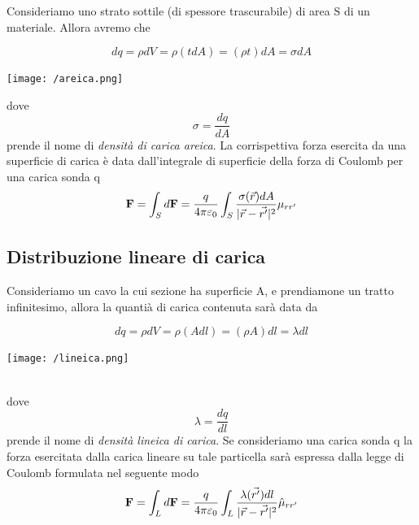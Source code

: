 Consideriamo uno strato sottile (di spessore trascurabile) di area S di un materiale. Allora avremo che 

\begin{minipage}{0.6\textwidth}
\begin{equation*}
dq = \rho dV = \rho (tdA) = (\rho t)dA = \sigma dA
\end{equation*}
\end{minipage}
\begin{minipage}{0.4\textwidth}
\centering
\texttt{[image: /areica.png]}
\end{minipage}
dove 
\begin{equation*}
	\sigma = \frac{dq}{dA}
\end{equation*}
prende il nome di \textit{densit\`a di carica areica}. La corrispettiva forza esercita da una superficie di carica \`e data dall'integrale di superficie della forza di Coulomb per una carica sonda q 
\begin{equation*}
	\bold{F} = \int_{S}d\bold{F} = \frac{q}{4 \pi \varepsilon_0} \int_{S} \frac{\sigma(\vec{r})dA}{|\vec{r}-\vec{r'}|^2} \mu_{rr'}
\end{equation*}

\subsection{Distribuzione lineare di carica}

Consideriamo un cavo  la cui sezione ha superficie A, e prendiamone un tratto infinitesimo, allora la quanti\`a di carica contenuta sar\`a data da

\begin{minipage}{0.6\textwidth}
\begin{equation*}
dq = \rho dV = \rho (Adl) = (\rho A)dl = \lambda dl
\end{equation*}
\end{minipage}
\begin{minipage}{0.3\textwidth}
\centering
\texttt{[image: /lineica.png]}
\end{minipage}
\\
dove 
\begin{equation*}
	\lambda = \frac{dq}{dl}
\end{equation*}
prende il nome di \textit{densit\`a lineica di carica}. Se consideriamo una carica sonda q la forza esercitata dalla carica lineare su tale particella sar\`a espressa dalla legge di Coulomb formulata nel seguente modo
\begin{equation*}
	\bold{F} = \int_{L} d\bold{F} = \frac{q}{4 \pi \varepsilon_0} \int_{L} \frac{\lambda(\vec{r'})dl}{|\vec{r} - \vec{r'}|^2} \hat{\mu}_{rr'}
\end{equation*}

